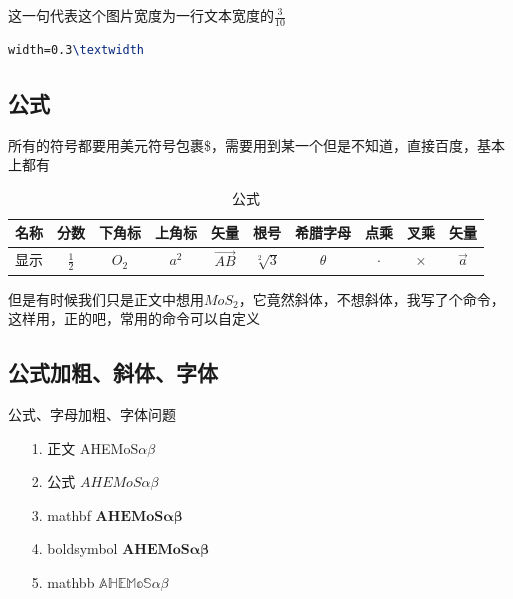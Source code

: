 \documentclass[AutoFakeBold]{LZUThesis}
\begin{document}
这一句代表这个图片宽度为一行文本宽度的$\frac{3}{10}$
\begin{lstlisting}[language = tex]
width=0.3\textwidth
\end{lstlisting}





\subsection{公式} %
\label{sub:公式}
所有的符号都要用美元符号包裹\$，需要用到某一个但是不知道，直接百度，基本上都有
\begin{table}[H]
    \centering
    \caption{公式}
    \begin{tabular}{cccccccccc} %
        \toprule
        名称 & 分数            & 下角标   & 上角标   & 矢量         & 根号            & 希腊字母     & 点乘      & 叉乘       & 矢量        \\
        \midrule
        显示 & $\frac{1}{2}$ & $O_2$ & $a^2$ & $\vec{AB}$ & $\sqrt[2]{3}$ & $\theta$ & $\cdot$ & $\times$ & $\vec{a}$ \\

        \bottomrule
    \end{tabular}
    \label{tbl_gs}
\end{table}

但是有时候我们只是正文中想用$MoS_2$，它竟然斜体，不想斜体，我写了个命令，这样用，正的吧，常用的命令可以自定义

\subsection{公式加粗、斜体、字体}

公式、字母加粗、字体问题

\begin{itemize}
    \item[1.] 正文 \qquad \quad AHEMoS$\alpha \beta$
    \item[2.] 公式 \qquad \quad $AHEMoS \alpha \beta$
    \item[3.] mathbf \qquad $\mathbf{AHEMoS\alpha \beta}$
    \item[4.] boldsymbol $\boldsymbol{AHEMoS\alpha \beta}$
    \item[5.] mathbb \qquad $\mathbb{AHEMoS\alpha \beta}$
\end{itemize}
\end{document}
